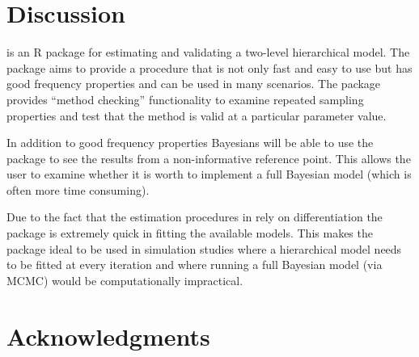 \documentclass[article]{jss}
\begin{document}


\section[Discussion]{Discussion}
 is an R package for estimating and validating a two-level hierarchical model. The package aims to provide a procedure that is not only fast and easy to use but has good frequency properties and can be used in many scenarios. The package provides ``method checking'' functionality to examine repeated sampling properties and test that the method is valid at a particular parameter value.

In addition to good frequency properties Bayesians will be able to use the package to see the results from a non-informative reference point. This allows the user to examine whether it is worth to implement a full Bayesian model (which is often more time consuming). 

Due to the fact that the estimation procedures in  rely on differentiation the package is extremely quick in fitting the available models. This makes the package ideal to be used in simulation studies where a hierarchical model needs to be fitted at every iteration and where running a full Bayesian model (via MCMC) would be computationally impractical.

\section[acknowledgments]{Acknowledgments}


\end{document}
